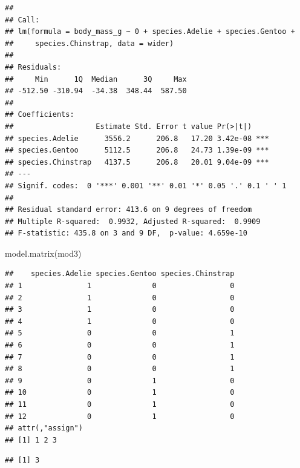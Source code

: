 \documentclass[
]{book}
\newenvironment{Shaded}{\begin{snugshade}}{\end{snugshade}}
\newcommand{\FunctionTok}[1]{\textcolor[rgb]{0.00,0.00,0.00}{#1}}
\newcommand{\NormalTok}[1]{#1}
\newcommand{\SpecialCharTok}[1]{\textcolor[rgb]{0.00,0.00,0.00}{#1}}
\begin{document}
\begin{verbatim}
## 
## Call:
## lm(formula = body_mass_g ~ 0 + species.Adelie + species.Gentoo + 
##     species.Chinstrap, data = wider)
## 
## Residuals:
##     Min      1Q  Median      3Q     Max 
## -512.50 -310.94  -34.38  348.44  587.50 
## 
## Coefficients:
##                   Estimate Std. Error t value Pr(>|t|)    
## species.Adelie      3556.2      206.8   17.20 3.42e-08 ***
## species.Gentoo      5112.5      206.8   24.73 1.39e-09 ***
## species.Chinstrap   4137.5      206.8   20.01 9.04e-09 ***
## ---
## Signif. codes:  0 '***' 0.001 '**' 0.01 '*' 0.05 '.' 0.1 ' ' 1
## 
## Residual standard error: 413.6 on 9 degrees of freedom
## Multiple R-squared:  0.9932, Adjusted R-squared:  0.9909 
## F-statistic: 435.8 on 3 and 9 DF,  p-value: 4.659e-10
\end{verbatim}

\begin{Shaded}
\begin{Highlighting}[]
\FunctionTok{model.matrix}\NormalTok{(mod3)}
\end{Highlighting}
\end{Shaded}

\begin{verbatim}
##    species.Adelie species.Gentoo species.Chinstrap
## 1               1              0                 0
## 2               1              0                 0
## 3               1              0                 0
## 4               1              0                 0
## 5               0              0                 1
## 6               0              0                 1
## 7               0              0                 1
## 8               0              0                 1
## 9               0              1                 0
## 10              0              1                 0
## 11              0              1                 0
## 12              0              1                 0
## attr(,"assign")
## [1] 1 2 3
\end{verbatim}

\begin{Shaded}
\end{Shaded}

\begin{verbatim}
## [1] 3
\end{verbatim}
\end{document}
